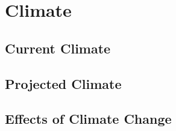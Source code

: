 \section{Climate}

\subsection{Current Climate}

\subsection{Projected Climate}

\subsection{Effects of Climate Change}

